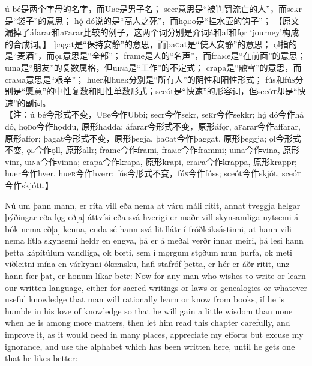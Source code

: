 \begin{translation*}{}
  ú bé是两个字母的名字，而U\textsc{b}e是男子名；
  secr意思是“被判罚流亡的人”，而se\textsc{k}r是“袋子”的意思；
  hǫ́ dó说的是“高人之死”，而hǫ\textsc{d}o是“挂水壶的钩子”；
  【原文漏掉了áfarar和a\textsc{f}arar比较的例子，这两个词分别是介词á和af和fǫr `journey'构成的合成词。】
  þagat是“保持安静”的意思，而þa\textsc{g}at是“使人安静”的意思；
  ǫl指的是“麦酒”，而ǫ\textsc{l}意思是“全部”；
  frame是人的“名声”，而fra\textsc{m}e是“在前面”的意思；
  uına是“朋友”的复数属格，但uı\textsc{n}a是“工作”的不定式；
  crapa是“融雪”的意思，而cra\textsc{m}a意思是“艰辛”； huer和hue\textsc{r}分别是“所有人”的阴性和阳性形式；
  fús和fú\textsc{s}分别是“愿意”的中性复数和阳性单数形式；sceót是“快速”的形容词，但sceó\textsc{t}却是“快速”的副词。\\

  【注：ú bé今形式不变，U\textsc{b}e今作Ubbi;
  secr今作sekr, se\textsc{k}r今作sekkr;
  h\'{ǫ} dó今作há dó, hǫ\textsc{d}o今作hǫddu, 原形hadda;
  áfarar今形式不变，原形áfǫr, a\textsc{f}arar今作affarar, 原形affǫr;
  þagat今形式不变，原形þegja, þa\textsc{g}at今作þaggat, 原形þeggja;
  ǫl今形式不变, ǫ\textsc{l}今作ǫll, 原形allr;
  frame今作frami, fra\textsc{m}e今作frammi;
  uına今作vina, 原形vinr, uı\textsc{n}a今作vinna; crapa今作krapa, 原形krapi, cra\textsc{p}a今作krappa, 原形krappr;
  huer今作hver, hue\textsc{r}今作hverr;
  fús今形式不变，fú\textsc{s}今作fúss;
  sceót今作skjót, sceó\textsc{t}今作skjótt.】
\end{translation*}
\begin{paracol}{2}
  Nú um þann mann, er ríta vill eða nema at váru máli ritit, annat tveggja helgar þýðingar eða lǫg eð[a] áttvísi eða svá hverigi er maðr vill skynsamliga nytsemi á bók nema eð[a] kenna, enda sé hann svá litillátr í fróðleiksástinni, at hann vili nema lítla skynsemi heldr en engva, þá er á meðal verðr innar meiri, þá lesi hann þetta kápítúlum vandliga, ok bœti, sem í mǫrgum stǫðum mun þurfa, ok meti viðleitni mína en várkynni ókœnsku, hafi stafróf þetta, er hér er áðr ritit, unz hann fær þat, er honum líkar betr:
  \switchcolumn
  Now for any man who wishes to write or learn our written language, either for sacred writings or laws or genealogies or whatever useful knowledge that man will rationally learn or know from books, if he is humble in his love of knowledge so that he will gain a little wisdom than none when he is among more matters, then let him read this chapter carefully, and improve it, as it would need in many places, appreciate my efforts but excuse my ignorance, and use the alphabet which has been written here, until he gets one that he likes better:
\end{paracol}
